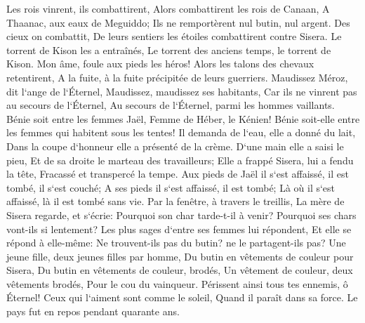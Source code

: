 \verse Les rois vinrent, ils combattirent, Alors combattirent les rois de Canaan, A Thaanac, aux eaux de Meguiddo; Ils ne remportèrent nul butin, nul argent. 
\verse Des cieux on combattit, De leurs sentiers les étoiles combattirent contre Sisera. 
\verse Le torrent de Kison les a entraînés, Le torrent des anciens temps, le torrent de Kison. Mon âme, foule aux pieds les héros! 
\verse Alors les talons des chevaux retentirent, A la fuite, à la fuite précipitée de leurs guerriers. 
\verse Maudissez Méroz, dit l`ange de l`Éternel, Maudissez, maudissez ses habitants, Car ils ne vinrent pas au secours de l`Éternel, Au secours de l`Éternel, parmi les hommes vaillants. 
\verse Bénie soit entre les femmes Jaël, Femme de Héber, le Kénien! Bénie soit-elle entre les femmes qui habitent sous les tentes! 
\verse Il demanda de l`eau, elle a donné du lait, Dans la coupe d`honneur elle a présenté de la crème. 
\verse D`une main elle a saisi le pieu, Et de sa droite le marteau des travailleurs; Elle a frappé Sisera, lui a fendu la tête, Fracassé et transpercé la tempe. 
\verse Aux pieds de Jaël il s`est affaissé, il est tombé, il s`est couché; A ses pieds il s`est affaissé, il est tombé; Là où il s`est affaissé, là il est tombé sans vie. 
\verse Par la fenêtre, à travers le treillis, La mère de Sisera regarde, et s`écrie: Pourquoi son char tarde-t-il à venir? Pourquoi ses chars vont-ils si lentement? 
\verse Les plus sages d`entre ses femmes lui répondent, Et elle se répond à elle-même: 
\verse Ne trouvent-ils pas du butin? ne le partagent-ils pas? Une jeune fille, deux jeunes filles par homme, Du butin en vêtements de couleur pour Sisera, Du butin en vêtements de couleur, brodés, Un vêtement de couleur, deux vêtements brodés, Pour le cou du vainqueur. 
\verse Périssent ainsi tous tes ennemis, ô Éternel! Ceux qui l`aiment sont comme le soleil, Quand il paraît dans sa force. Le pays fut en repos pendant quarante ans. 

